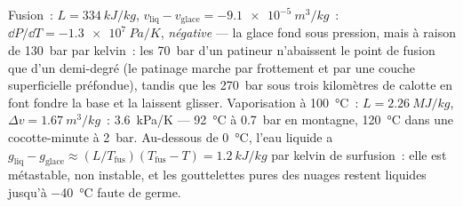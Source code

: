 \begin{example}\label{ex:b2:thermodynamic-potentials:water}
Fusion~: $L = \qty{334}{kJ/kg}$, $v_{\text{liq}} - v_{\text{glace}} = -\qty{9.1e-5}{m^3/kg}$~:
$\dd P/\dd T = \qty{-1.3e7}{Pa/K}$, \emph{négative} --- la glace fond sous
pression, mais à raison de \qty{130}{bar} par kelvin~: les \qty{70}{bar} d'un patineur n'abaissent
le point de fusion que d'un demi-degré (le patinage marche par frottement et
par une couche superficielle préfondue), tandis que les \qty{270}{bar} sous trois
kilomètres de calotte en font fondre la base et la laissent glisser. Vaporisation à
\qty{100}{\celsius}~: $L = \qty{2.26}{MJ/kg}$, $\Delta v = \qty{1.67}{m^3/kg}$~:
\qty{3.6}{kPa/K} --- \qty{92}{\celsius} à \qty{0.7}{bar} en montagne,
\qty{120}{\celsius} dans une cocotte-minute à \qty{2}{bar}. Au-dessous de
\qty{0}{\celsius}, l'eau liquide a $g_{\text{liq}} - g_{\text{glace}} \approx
(L/T_{\text{fus}})(T_{\text{fus}} - T) = \qty{1.2}{kJ/kg}$ par kelvin de
surfusion~: elle est métastable, non instable, et les gouttelettes pures des
nuages restent liquides jusqu'à \qty{-40}{\celsius} faute de germe.
\end{example}

